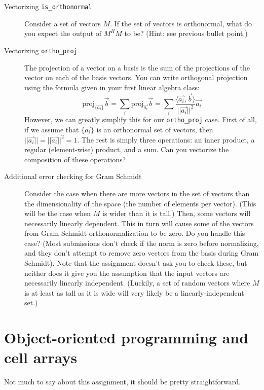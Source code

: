 \documentclass{article}
\begin{document}
\begin{description}
\item[Vectorizing \texttt{is_orthonormal}] Consider a set of vectors $M$. If the set of vectors is orthonormal, what do you expect the output of $M^HM$ to be? (Hint: see previous bullet point.)

\item[Vectorizing \texttt{ortho_proj}] The projection of a vector on a basis is the sum of the projections of the vector on each of the basis vectors. You can write orthogonal projection using the formula given in your first linear algebra class: \[\text{proj}_{\{\vec{a_i}\}}\vec{b}=\sum_i\text{proj}_{\vec{a_i}}\vec{b}=\sum_i\frac{\langle\vec{a_i},\vec{b}\rangle}{||\vec{a_i}||^2}\vec{a_i}\] However, we can greatly simplify this for our \texttt{ortho_proj} case. First of all, if we assume that $\{\vec{a_i}\}$ is an orthonormal set of vectors, then $||\vec{a_i}||=||\vec{a_i}||^2=1$. The rest is simply three operations: an inner product, a regular (element-wise) product, and a sum. Can you vectorize the composition of these operations?

\item[Additional error checking for Gram Schmidt] Consider the case when there are more vectors in the set of vectors than the dimensionality of the space (the number of elements per vector). (This will be the case when $M$ is wider than it is tall.) Then, some vectors will necessarily linearly dependent. This in turn will cause some of the vectors from Gram Schmidt orthonormalization to be zero. Do you handle this case? (Most submissions don't check if the norm is zero before normalizing, and they don't attempt to remove zero vectors from the basis during Gram Schmidt). Note that the assignment doesn't ask you to check these, but neither does it give you the assumption that the input vectors are necessarily linearly independent. (Luckily, a set of random vectors where $M$ is at least as tall as it is wide will very likely be a linearly-independent set.)

\end{description}

\section{Object-oriented programming and cell arrays}
Not much to say about this assignment, it should be pretty straightforward.
\end{document}
